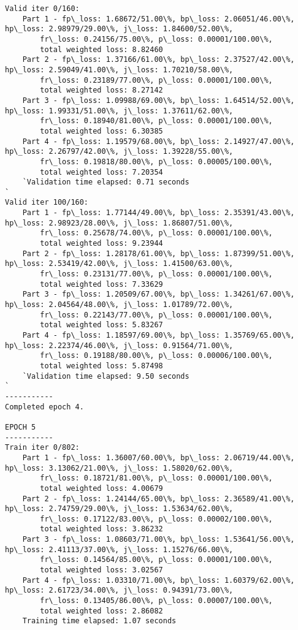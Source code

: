 \documentclass[11pt]{article}
\begin{document}
\begin{Verbatim}[commandchars=\\\{\}]
Valid iter 0/160:
	Part 1 - fp\_loss: 1.68672/51.00\%, bp\_loss: 2.06051/46.00\%, hp\_loss: 2.98979/29.00\%, j\_loss: 1.84600/52.00\%, 
		fr\_loss: 0.24156/75.00\%, p\_loss: 0.00001/100.00\%, 
		total weighted loss: 8.82460
	Part 2 - fp\_loss: 1.37166/61.00\%, bp\_loss: 2.37527/42.00\%, hp\_loss: 2.59049/41.00\%, j\_loss: 1.70210/58.00\%, 
		fr\_loss: 0.23189/77.00\%, p\_loss: 0.00001/100.00\%, 
		total weighted loss: 8.27142
	Part 3 - fp\_loss: 1.09988/69.00\%, bp\_loss: 1.64514/52.00\%, hp\_loss: 1.99331/51.00\%, j\_loss: 1.37611/62.00\%, 
		fr\_loss: 0.18940/81.00\%, p\_loss: 0.00001/100.00\%, 
		total weighted loss: 6.30385
	Part 4 - fp\_loss: 1.19579/68.00\%, bp\_loss: 2.14927/47.00\%, hp\_loss: 2.26797/42.00\%, j\_loss: 1.39228/55.00\%, 
		fr\_loss: 0.19818/80.00\%, p\_loss: 0.00005/100.00\%, 
		total weighted loss: 7.20354
	`Validation time elapsed: 0.71 seconds
`
Valid iter 100/160:
	Part 1 - fp\_loss: 1.77144/49.00\%, bp\_loss: 2.35391/43.00\%, hp\_loss: 2.98923/28.00\%, j\_loss: 1.86807/51.00\%, 
		fr\_loss: 0.25678/74.00\%, p\_loss: 0.00001/100.00\%, 
		total weighted loss: 9.23944
	Part 2 - fp\_loss: 1.28178/61.00\%, bp\_loss: 1.87399/51.00\%, hp\_loss: 2.53419/42.00\%, j\_loss: 1.41500/63.00\%, 
		fr\_loss: 0.23131/77.00\%, p\_loss: 0.00001/100.00\%, 
		total weighted loss: 7.33629
	Part 3 - fp\_loss: 1.20509/67.00\%, bp\_loss: 1.34261/67.00\%, hp\_loss: 2.04564/48.00\%, j\_loss: 1.01789/72.00\%, 
		fr\_loss: 0.22143/77.00\%, p\_loss: 0.00001/100.00\%, 
		total weighted loss: 5.83267
	Part 4 - fp\_loss: 1.18597/69.00\%, bp\_loss: 1.35769/65.00\%, hp\_loss: 2.22374/46.00\%, j\_loss: 0.91564/71.00\%, 
		fr\_loss: 0.19188/80.00\%, p\_loss: 0.00006/100.00\%, 
		total weighted loss: 5.87498
	`Validation time elapsed: 9.50 seconds
`
-----------
Completed epoch 4.

EPOCH 5
-----------
Train iter 0/802:
	Part 1 - fp\_loss: 1.36007/60.00\%, bp\_loss: 2.06719/44.00\%, hp\_loss: 3.13062/21.00\%, j\_loss: 1.58020/62.00\%, 
		fr\_loss: 0.18721/81.00\%, p\_loss: 0.00001/100.00\%, 
		total weighted loss: 4.00679
	Part 2 - fp\_loss: 1.24144/65.00\%, bp\_loss: 2.36589/41.00\%, hp\_loss: 2.74759/29.00\%, j\_loss: 1.53634/62.00\%, 
		fr\_loss: 0.17122/83.00\%, p\_loss: 0.00002/100.00\%, 
		total weighted loss: 3.86232
	Part 3 - fp\_loss: 1.08603/71.00\%, bp\_loss: 1.53641/56.00\%, hp\_loss: 2.41113/37.00\%, j\_loss: 1.15276/66.00\%, 
		fr\_loss: 0.14564/85.00\%, p\_loss: 0.00001/100.00\%, 
		total weighted loss: 3.02567
	Part 4 - fp\_loss: 1.03310/71.00\%, bp\_loss: 1.60379/62.00\%, hp\_loss: 2.61723/34.00\%, j\_loss: 0.94391/73.00\%, 
		fr\_loss: 0.13405/86.00\%, p\_loss: 0.00007/100.00\%, 
		total weighted loss: 2.86082
	Training time elapsed: 1.07 seconds


\end{Verbatim}
\end{document}
